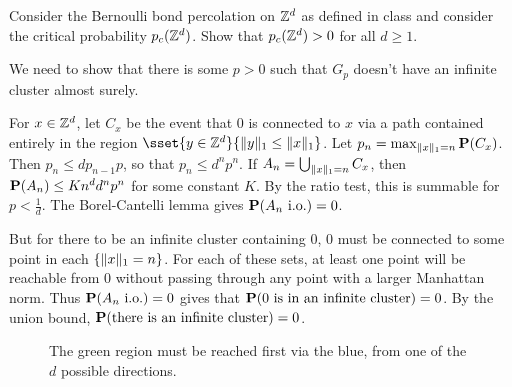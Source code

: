 \documentclass[12pt]{article}
\begin{document}
\begin{problem*}
    Consider the Bernoulli bond percolation on $\Z^d$ as defined in class
    and consider the critical probability $p_c(\Z^d)$.
    Show that $p_c(\Z^d) > 0$ for all $d \ge 1$.
\end{problem*}
\begin{solution}
    We need to show that there is some $p > 0$ such that $G_p$ doesn't
    have an infinite cluster almost surely.

    For $x \in \Z^d$, let $C_x$ be the event that $0$ is connected to $x$
    via a path contained entirely in the region
    $\sset{y \in \Z^d}{\norm y_1 \le \norm x_1}$.
    Let $p_n = \max_{\norm x_1 = n} \P(C_x)$.
    Then $p_n \le d p_{n-1} p$, so that $p_n \le d^n p^n$.
    If $A_n = \bigcup_{\norm x_1 = n} C_x$, then
    $\P(A_n) \le K n^d d^n p^n$ for some constant $K$.
    By the ratio test, this is summable for $p < \frac1d$.
    The Borel-Cantelli lemma gives $\P(A_n \io) = 0$.

    But for there to be an infinite cluster containing $0$,
    $0$ must be connected to some point in each $\set{\norm x_1 = n}$.
    For each of these sets, at least one point will be reachable from $0$
    without passing through any point with a larger Manhattan norm.
    Thus $\P(A_n \io) = 0$ gives that
    $\P(0 \text{ is in an infinite cluster}) = 0$.
    By the union bound, $\P(\text{there is an infinite cluster}) = 0$.
\end{solution}
\begin{figure}
    \centering
    \caption{The green region must be reached first via the blue,
    from one of the $d$ possible directions.}
\end{figure}
\end{document}
